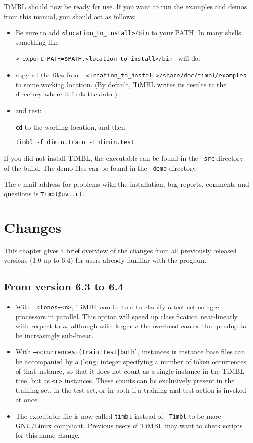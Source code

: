 \documentclass{book}
\begin{document}
TiMBL should now be ready for use. If you want to run the examples and
demos from this manual, you should act as follows:

\begin{itemize}
\item Be sure to add {\tt <location\_to\_install>/bin} to your PATH. 
In many shells something like

 {\tt > export PATH=\$PATH:<location\_to\_install>/bin }
will do.
\item copy all the files from {\tt
  <location\_to\_install>/share/doc/timbl/examples} to some working
location. (By default, TiMBL writes its results to the directory where
it finds the data.)
\item and test:

{\tt cd} to the working location, and then

{\tt timbl -f dimin.train -t dimin.test}
\end{itemize}

If you did not install TiMBL, the executable can be found in the {\tt
  src} directory of the build. The demo files can be found in the {\tt
  demo} directory.

The e-mail address for problems with the installation, bug reports,
comments and questions is {\tt Timbl@uvt.nl}.

\chapter{Changes}
\label{changes}

This chapter gives a brief overview of the changes from all previously
released versions (1.0 up to 6.4) for users already familiar with the
program.

\section{From version 6.3 to 6.4}

\begin{itemize}
\item With {\tt --clones=<n>}, TiMBL can be told to classify a test
  set using $n$ processors in parallel. This option will speed up
  classification near-linearly with respect to $n$, although with
  larger $n$ the overhead causes the speedup to be increasingly
  sub-linear.
\item With {\tt --occurrences=\{train|test|both\}}, instances in
  instance base files can be accompanied by a (long) integer
  specifying a number of token occurrences of that instance, so that
  it does not count as a single instance in the TiMBL tree, but as
  {\tt <n>} instances. These counts can be exclusively present in the
  training set, in the test set, or in both if a training and test
  action is invoked at once.
\item The executable file is now called {\tt timbl} instead of {\tt
    Timbl} to be more GNU/Linux compliant. Previous users of TiMBL may
  want to check scripts for this name change.
\end{itemize}
\end{document}
